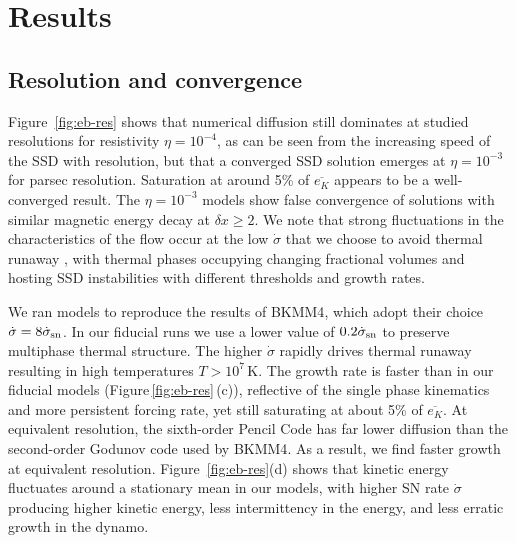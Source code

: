 \documentclass[preprint2]{aastex63}
\newcommand\SNr{\dot\sigma_{\rm sn}}
\newcommand\dx{ {\delta x}}
\newcommand\BKM{{\sf BKMM4}}
\begin{document}

\section{Results} \label{sec:results}

\subsection{{Resolution and convergence}} \label{sec:conv}
{Figure~\ref{fig:eb-res} shows
 that numerical diffusion still dominates at studied
 resolutions for resistivity  $\eta = 10^{-4}$, as can be seen from the
 increasing speed of the SSD with resolution, but that a converged SSD solution
 emerges at  $\eta = 10^{-3}$ for parsec resolution.}
 Saturation at around 5\% of $\overline{e_K}$ appears to be a well-converged
 result.
 {The $\eta = 10^{-3}$ models show} false convergence
 \citep{FMA91} of solutions with similar magnetic energy decay at $\dx\geq2$.
 {We note that strong fluctuations in the characteristics of the flow
 {occur at the} low $\dot\sigma$ {that we choose to avoid thermal runaway
 \citep{LOCBN15},} with thermal phases occupying changing fractional volumes
 \citep[e.g.][]{gatto2015} and hosting SSD instabilities with different 
 thresholds and growth rates.
 }

 {We ran models to reproduce the results of \BKM, which adopt their choice
 $\dot\sigma = 8\SNr$. In our fiducial runs we use a lower value of $0.2\SNr$} 
 to preserve multiphase thermal structure.
 The higher $\dot\sigma$ rapidly drives thermal runaway resulting in high
 temperatures $T>10^7$\,K.
 The growth rate is faster {than in our fiducial models} (Figure\,\ref{fig:eb-res}\,(c)), reflective of the
 single phase kinematics and more persistent forcing rate, yet {still}
 saturating at about 5\% of $\overline{e_K}$.
 {At equivalent resolution, the sixth-order Pencil Code has far lower diffusion
 than the second-order Godunov code used by \BKM. As a result, we find faster
 growth at equivalent resolution.}
{
         Figure~\ref{fig:eb-res}(d) shows that kinetic energy fluctuates
         around a stationary mean in our models, with higher SN rate $\dot{\sigma}$
         producing higher kinetic energy,
 less intermittency in the energy, and less erratic growth in the
 dynamo.} 
 
\end{document}
